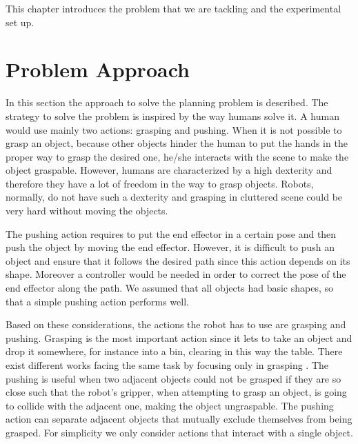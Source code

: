 This chapter introduces the problem that we are tackling and the experimental set up.

\section{Problem Approach}
In this section the approach to solve the planning problem is described. The strategy to solve the problem is inspired by the way humans solve it. A human would use mainly two actions: grasping and pushing. When it is not possible to grasp an object, because other objects hinder the human to put the hands in the proper way to grasp the desired one, he/she interacts with the scene to make the object graspable. However,  humans are characterized by a high dexterity and therefore they have a lot of freedom in the way to grasp objects. Robots, normally, do not have such a dexterity and grasping in cluttered scene could be very hard without moving the objects. 

The pushing action requires to put the end effector in a certain pose and then push the object by moving the end effector. However, it is difficult to push an object and ensure that it follows the desired path since this action depends on its shape. Moreover a controller would be needed in order to correct the pose of the end effector along the path. We assumed that all objects had basic shapes, so that a simple pushing action performs well.

Based on these considerations, the actions the robot has to use are grasping and pushing.
Grasping is the most important action since it lets to take an object and drop it somewhere, for instance into a bin, clearing in this way the table. There exist different works facing the same task by focusing only in grasping \citep{haf,AGILE}. The pushing is useful when two adjacent objects could not be grasped if they are so close such that the robot's gripper, when attempting to grasp an object, is going to collide with the adjacent one, making the object ungraspable. The pushing action can separate adjacent objects that mutually exclude themselves from being grasped. 
For simplicity we only consider actions that interact with a single object.%

